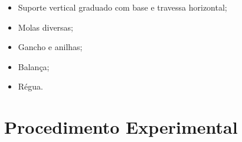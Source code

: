 \begin{itemize}
	\item Suporte vertical graduado com base e travessa horizontal;
	\item Molas diversas;
	\item Gancho e anilhas;
	\item Balança;
	\item Régua.
\end{itemize}

\section{Procedimento Experimental}

